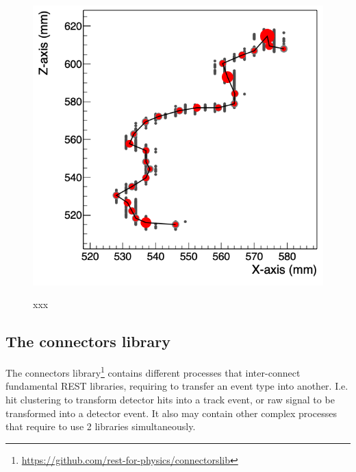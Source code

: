 \begin{figure}
{    \includegraphics[totalheight=4.9cm]{images/TrackReconnected.png}}
    \caption{xxx}
    \label{fig:tracklib}
\end{figure}

\subsection{The connectors library}

The connectors library\footnote{\url{https://github.com/rest-for-physics/connectorslib}} contains different processes that inter-connect fundamental REST libraries, requiring to transfer an event type into another. I.e. hit clustering to transform detector hits into a track event, or raw signal to be transformed into a detector event. It also may contain other complex processes that require to use 2 libraries simultaneously.

\begin{figure}[hb!]
  \centering
	\caption{}\label{fig:connectorslib}
\end{figure}




